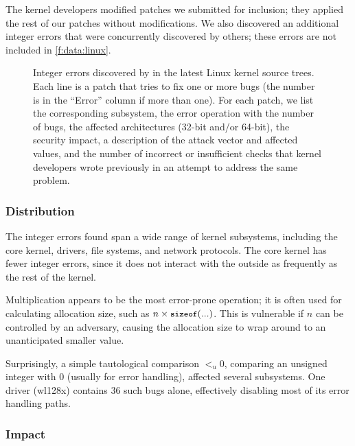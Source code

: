 The kernel developers modified \nrpatchesmod patches we submitted
for inclusion; they applied the rest of our patches without
modifications.
%
We also discovered an additional \nrbugsbyothers integer errors that
were concurrently discovered by others; these errors are not included
in \autoref{f:data:linux}.

\begin{figure*}
\centering
\footnotesize

\caption{Integer errors discovered by \sys in the latest Linux
kernel source trees.  Each line is a patch that tries to fix one
or more bugs (the number is in the ``Error'' column if more than
one).  For each patch, we list the corresponding subsystem, the
error operation with the number of bugs, the affected architectures
(32-bit and/or 64-bit), the security impact, a
description of the attack vector and affected values, and the number
of incorrect or insufficient checks that kernel developers wrote
previously in an attempt to address the same problem.}
\label{f:data:linux}
\end{figure*}

\subsubsection{Distribution}

The integer errors \sys found span a wide range of kernel subsystems,
including the core kernel, drivers, file systems, and network protocols.
The core kernel has fewer integer errors, since it does not
interact with the outside as frequently as the rest of the kernel.

Multiplication appears to be the most error-prone operation; it is
often used for calculating allocation size, such as $n \times
\cc{sizeof}(...)$.  This is vulnerable if $n$ can be controlled
by an adversary, causing the allocation size to wrap around to an
unanticipated smaller value.

Surprisingly,  a simple tautological comparison $<_u 0$,
comparing an unsigned integer with 0 (usually for error handling),
affected several subsystems.
One driver (wl128x) contains 36 such bugs alone, effectively
disabling most of its error handling paths.

\subsubsection{Impact}

